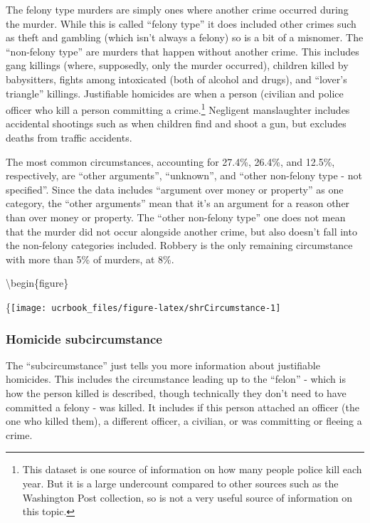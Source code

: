 \documentclass[
  12pt,
  openany]{book}
\begin{document}
The felony type murders are simply ones where another crime occurred during the murder. While this is called ``felony type'' it does included other crimes such as theft and gambling (which isn't always a felony) so is a bit of a misnomer. The ``non-felony type'' are murders that happen without another crime. This includes gang killings (where, supposedly, only the murder occurred), children killed by babysitters, fights among intoxicated (both of alcohol and drugs), and ``lover's triangle'' killings. Justifiable homicides are when a person (civilian and police officer who kill a person committing a crime.\footnote{This dataset is one source of information on how many people police kill each year. But it is a large undercount compared to other sources such as the Washington Post collection, so is not a very useful source of information on this topic.} Negligent manslaughter includes accidental shootings such as when children find and shoot a gun, but excludes deaths from traffic accidents.

The most common circumstances, accounting for 27.4\%, 26.4\%, and 12.5\%, respectively, are ``other arguments'', ``unknown'', and ``other non-felony type - not specified''. Since the data includes ``argument over money or property'' as one category, the ``other arguments'' mean that it's an argument for a reason other than over money or property. The ``other non-felony type'' one does not mean that the murder did not occur alongside another crime, but also doesn't fall into the non-felony categories included. Robbery is the only remaining circumstance with more than 5\% of murders, at 8\%.

\textbackslash begin\{figure\}

\{\centering \texttt{[image: ucrbook\_files/figure-latex/shrCircumstance-1]}

\hypertarget{homicide-subcircumstance}{%
\subsubsection{Homicide subcircumstance}\label{homicide-subcircumstance}}

The ``subcircumstance'' just tells you more information about justifiable homicides. This includes the circumstance leading up to the ``felon'' - which is how the person killed is described, though technically they don't need to have committed a felony - was killed. It includes if this person attached an officer (the one who killed them), a different officer, a civilian, or was committing or fleeing a crime.
\end{document}
